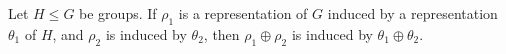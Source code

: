 Let $H \leq G$ be groups. If $\rho_1$ is a representation of $G$ induced by a representation $\theta_1$ of $H$, and $\rho_2$ is induced by $\theta_2$, then $\rho_1 \oplus \rho_2$ is induced by $\theta_1 \oplus \theta_2$.
